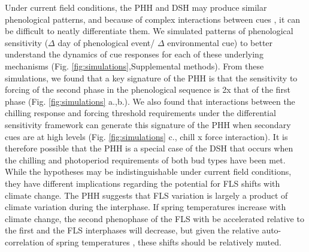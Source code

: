\documentclass[11pt]{article}
\begin{document}
\noindent Under current field conditions, the PHH and DSH may produce similar phenological patterns, and because of complex interactions between cues \citep{}, it can be difficult to neatly differentiate them. We simulated patterns of phenological sensitivity ($\Delta$ day of phenological event/ $\Delta$ environmental cue) to better understand the dynamics of cue responses for each of these underlying mechanisms (Fig. \ref{fig:simulations},Supplemental methods). From these simulations, we found that a key signature of the PHH is that the sensitivity to forcing of the second phase in the phenological sequence is 2x that of the first phase (Fig. \ref{fig:simulations} a.,b.).  We also found that interactions between the chilling response and forcing threshold requirements under the differential sensitivity framework can generate this signature of the PHH when secondary cues are at high levels (Fig. \ref{fig:simulations} c., chill x force interaction). It is therefore possible that the PHH is a special case of the DSH that occurs when the chilling and photoperiod requirements of both bud types have been met.\\

\noident While the hypotheses may be indistinguishable under current field conditions, they have different implications regarding the potential for FLS shifts with climate change. The PHH suggests that FLS variation is largely a product of climate variation during the interphase. If spring temperatures increase with climate change, the second phenophase of the FLS with be accelerated relative to the first and the FLS interphases will decrease, but given the relative auto-correlation of spring temperatures \citep{Di-Cecco:2018aa}, these shifts should be relatively muted. \\
\end{document}
